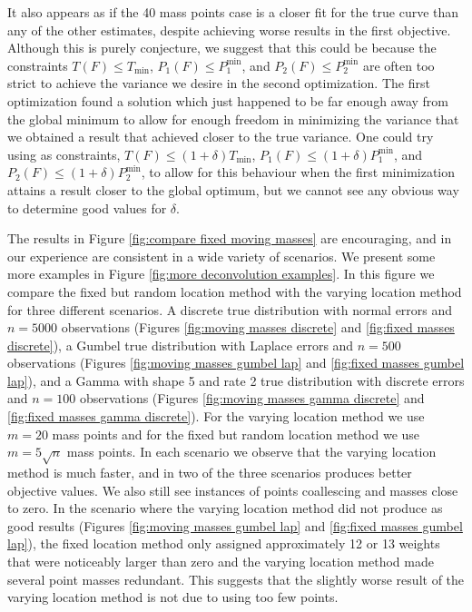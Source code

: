 It also appears as if the 40 mass points case is a closer fit for the true curve than any of the other estimates, despite achieving worse results in the first objective. Although this is purely conjecture, we suggest that this could be because the constraints $T(F) \leq T_\mathrm{min}$, $P_1(F) \leq P_1^\mathrm{min}$, and $P_2(F) \leq P_2^\mathrm{min}$ are often too strict to achieve the variance we desire in the second optimization. The first optimization found a solution which just happened to be far enough away from the global minimum to allow for enough freedom in minimizing the variance that we obtained a result that achieved closer to the true variance. One could try using as constraints, $T(F) \leq (1 + \delta) T_\mathrm{min}$, $P_1(F) \leq (1 + \delta) P_1^\mathrm{min}$, and $P_2(F) \leq (1 + \delta) P_2^\mathrm{min}$, to allow for this behaviour when the first minimization attains a result closer to the global optimum, but we cannot see any obvious way to determine good values for $\delta$.

The results in Figure \ref{fig:compare fixed moving masses} are encouraging, and in our experience are consistent in a wide variety of scenarios. We present some more examples in Figure \ref{fig:more deconvolution examples}. 
In this figure we compare the fixed but random location method with the varying location method for three different scenarios. A discrete true distribution with normal errors and $n = 5000$ observations (Figures \ref{fig:moving masses discrete} and \ref{fig:fixed masses discrete}), a Gumbel true distribution with Laplace errors and $n = 500$ observations (Figures \ref{fig:moving masses gumbel lap} and \ref{fig:fixed masses gumbel lap}), and a Gamma with shape 5 and rate 2 true distribution with discrete errors and $n = 100$ observations (Figures \ref{fig:moving masses gamma discrete} and \ref{fig:fixed masses gamma discrete}). For the varying location method we use $m = 20$ mass points and for the fixed but random location method we use $m = 5\sqrt{n}$ mass points. In each scenario we observe that the varying location method is much faster, and in two of the three scenarios produces better objective values. We also still see instances of points coallescing and masses close to zero. In the scenario where the varying location method did not produce as good results (Figures \ref{fig:moving masses gumbel lap} and \ref{fig:fixed masses gumbel lap}), the fixed location method only assigned approximately 12 or 13 weights that were noticeably larger than zero and the varying location method made several point masses redundant. This suggests that the slightly worse result of the varying location method is not due to using too few points.

